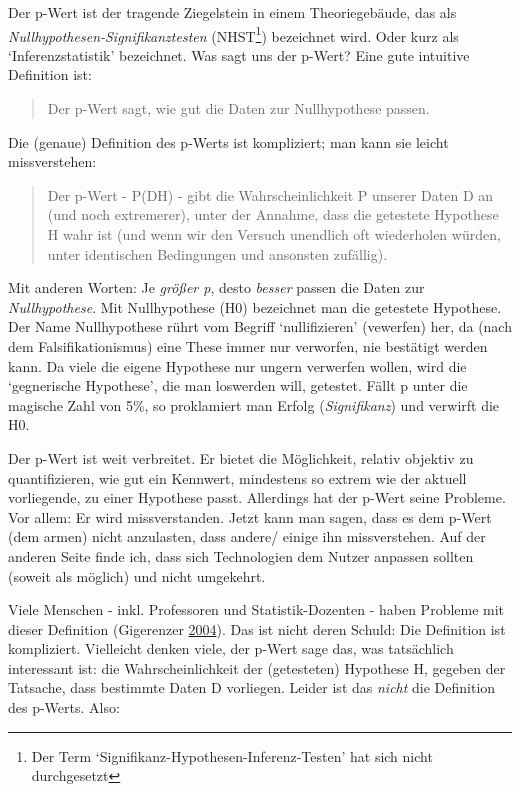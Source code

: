 \documentclass[12pt,ngerman,]{book}
\let\rmarkdownfootnote\footnote%
\def\footnote{\protect\rmarkdownfootnote}
\theoremstyle{definition}
\theoremstyle{definition}
\theoremstyle{remark}
\begin{document}
Der p-Wert ist der tragende Ziegelstein in einem Theoriegebäude, das als
\emph{Nullhypothesen-Signifikanztesten}
(NHST\footnote{Der Term `Signifikanz-Hypothesen-Inferenz-Testen' hat
  sich nicht durchgesetzt}) bezeichnet wird. Oder kurz als
`Inferenzstatistik' bezeichnet. Was sagt uns der p-Wert? Eine gute
intuitive Definition ist:

\begin{quote}
Der p-Wert sagt, wie gut die Daten zur Nullhypothese passen.
\end{quote}

Die (genaue) Definition des p-Werts ist kompliziert; man kann sie leicht
missverstehen:

\begin{quote}
Der p-Wert - P(D\textbar{}H) - gibt die Wahrscheinlichkeit P unserer
Daten D an (und noch extremerer), unter der Annahme, dass die getestete
Hypothese H wahr ist (und wenn wir den Versuch unendlich oft wiederholen
würden, unter identischen Bedingungen und ansonsten zufällig).
\end{quote}

Mit anderen Worten: Je \emph{größer p}, desto \emph{besser} passen die
Daten zur \emph{Nullhypothese}. Mit Nullhypothese
(H0) bezeichnet man die getestete Hypothese. Der Name Nullhypothese
rührt vom Begriff `nullifizieren' (vewerfen) her, da (nach dem
Falsifikationismus) eine These immer nur verworfen, nie bestätigt werden
kann. Da viele die eigene Hypothese nur ungern verwerfen wollen, wird
die `gegnerische Hypothese', die man loswerden will, getestet. Fällt p
unter die magische Zahl von 5\%, so proklamiert man Erfolg
(\emph{Signifikanz}) und verwirft die H0.

Der p-Wert ist weit verbreitet. Er bietet die Möglichkeit, relativ
objektiv zu quantifizieren, wie gut ein Kennwert, mindestens so extrem
wie der aktuell vorliegende, zu einer Hypothese passt. Allerdings hat
der p-Wert seine Probleme. Vor allem: Er wird missverstanden. Jetzt kann
man sagen, dass es dem p-Wert (dem armen) nicht anzulasten, dass andere/
einige ihn missverstehen. Auf der anderen Seite finde ich, dass sich
Technologien dem Nutzer anpassen sollten (soweit als möglich) und nicht
umgekehrt.

Viele Menschen - inkl. Professoren und Statistik-Dozenten - haben
Probleme mit dieser Definition (Gigerenzer
\protect\hyperlink{ref-Gigerenzer2004}{2004}). Das ist nicht deren
Schuld: Die Definition ist kompliziert. Vielleicht denken viele, der
p-Wert sage das, was tatsächlich interessant ist: die Wahrscheinlichkeit
der (getesteten) Hypothese H, gegeben der Tatsache, dass bestimmte Daten
D vorliegen. Leider ist das \emph{nicht} die Definition des p-Werts.
Also:
\end{document}
